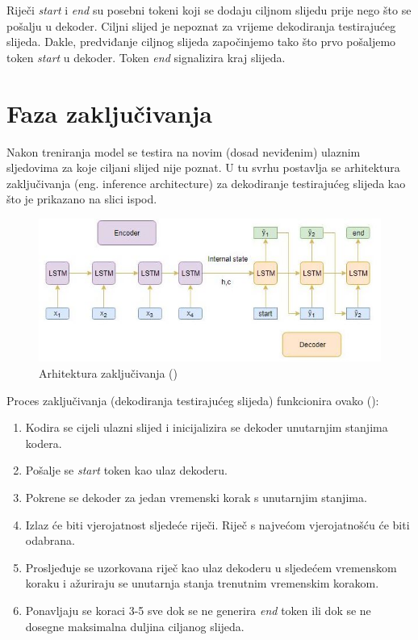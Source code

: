 \documentclass[times, utf8, zavrsni, numeric]{fer}
\begin{document}
Riječi \emph{start} i \emph{end} su posebni tokeni koji se dodaju ciljnom slijedu prije nego što se pošalju u dekoder.
Ciljni slijed je nepoznat za vrijeme dekodiranja testirajućeg slijeda.
Dakle, predviđanje ciljnog slijeda započinjemo tako što prvo pošaljemo token \emph{start} u dekoder.
Token \emph{end} signalizira kraj slijeda.

\section{Faza zaključivanja}
Nakon treniranja model se testira na novim (dosad neviđenim) ulaznim sljedovima za koje ciljani slijed nije poznat.
U tu svrhu postavlja se arhitektura zaključivanja (eng. inference architecture) za dekodiranje testirajućeg slijeda kao što je prikazano na slici ispod.
\begin{figure}[htb]
\centering
\includegraphics[width=15cm]{img/inference-architecture.jpg}
\caption{Arhitektura zaključivanja (\citet{article3})}
\label{fig:inference-architecture}
\end{figure}
Proces zaključivanja (dekodiranja testirajućeg slijeda) funkcionira ovako (\citet{article3}):
\begin{enumerate}
    \item Kodira se cijeli ulazni slijed i inicijalizira se dekoder unutarnjim stanjima kodera.
    \item Pošalje se \emph{start} token kao ulaz dekoderu.
    \item Pokrene se dekoder za jedan vremenski korak s unutarnjim stanjima.
    \item Izlaz će biti vjerojatnost sljedeće riječi. Riječ s najvećom vjerojatnošću će biti odabrana.
    \item Prosljeđuje se uzorkovana riječ kao ulaz dekoderu u sljedećem vremenskom koraku i ažuriraju se unutarnja stanja trenutnim vremenskim korakom.
    \item Ponavljaju se koraci 3-5 sve dok se ne generira \emph{end} token ili dok se ne dosegne maksimalna duljina ciljanog slijeda.
\end{enumerate}
\end{document}
